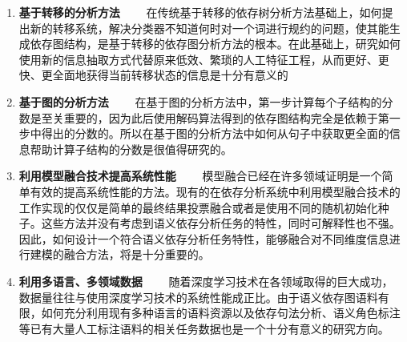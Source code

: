 \begin{enumerate}
\item \textbf{基于转移的分析方法}
\ \ \ \ 在传统基于转移的依存树分析方法基础上，如何提出新的转移系统，解决分类器不知道何时对一个词进行规约的问题，使其能生成依存图结构，是基于转移的依存图分析方法的根本。在此基础上，研究如何使用新的信息抽取方式代替原来低效、繁琐的人工特征工程，从而更好、更快、更全面地获得当前转移状态的信息是十分有意义的
	
\item \textbf{基于图的分析方法}
\ \ \ \ 在基于图的分析方法中，第一步计算每个子结构的分数是至关重要的，因为此后使用解码算法得到的依存图结构完全是依赖于第一步中得出的分数的。所以在基于图的分析方法中如何从句子中获取更全面的信息帮助计算子结构的分数是很值得研究的。
	
\item \textbf{利用模型融合技术提高系统性能}
\ \ \ \ 模型融合已经在许多领域证明是一个简单有效的提高系统性能的方法。现有的在依存分析系统中利用模型融合技术的工作实现的仅仅是简单的最终结果投票融合或者是使用不同的随机初始化种子。这些方法并没有考虑到语义依存分析任务的特性，同时可解释性也不强。因此，如何设计一个符合语义依存分析任务特性，能够融合对不同维度信息进行建模的融合方法，将是十分重要的。
	
\item \textbf{利用多语言、多领域数据}
\ \ \ \ 随着深度学习技术在各领域取得的巨大成功，数据量往往与使用深度学习技术的系统性能成正比。由于语义依存图语料有限，如何充分利用现有多种语言的语料资源以及依存句法分析、语义角色标注等已有大量人工标注语料的相关任务数据也是一个十分有意义的研究方向。
	
\end{enumerate}





